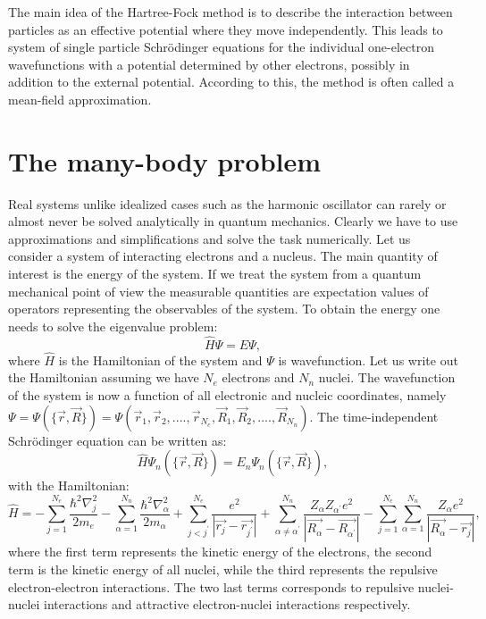 \documentclass[twoside,english]{uiofysmaster}
\begin{document}
The main idea of the Hartree-Fock method is to describe the
interaction between particles as an effective potential where they
move independently. This leads to system of single particle
Schr\"{o}dinger equations for the individual one-electron
wavefunctions with a potential determined by other electrons, possibly
in addition to the external potential. According to this, the  method is
often called a mean-field approximation.  \\




\section{The many-body problem}

Real systems unlike idealized cases such as the harmonic oscillator
can rarely or almost never be solved analytically in quantum mechanics.  Clearly we have
to use approximations and simplifications and solve the task
numerically.  Let us consider a system of interacting electrons and a
nucleus. The main quantity of interest is the energy of the system. If
we treat the system from a quantum mechanical point of view the
measurable quantities are expectation values of operators representing
the observables of the system.  To obtain the energy one needs to
solve the eigenvalue problem:
\[
\hat{H}\Psi = E\Psi,
\]
where $\hat{H}$ is the Hamiltonian of the system and $\Psi$ is
wavefunction.  Let us write out the Hamiltonian assuming we have $N_e$
electrons and $N_n$ nuclei. The wavefunction of the system is now a
function of all electronic and nucleic coordinates, namely
$\Psi=\Psi(\{\vec{r}, \vec{R}\}) = \Psi(\vec{r}_1, \vec{r}_2, ....,
\vec{r}_{N_e}, \vec{R}_1, \vec{R}_2, ...., \vec{R}_{N_n})$. The
time-independent Schr\"{o}dinger equation can be written as:
\begin{equation}\label{MBproblem}
\hat{H}\Psi_n(\{\vec{r}, \vec{R}\}) = E_n\Psi_n(\{\vec{r}, \vec{R}\}),
\end{equation}
with the Hamiltonian:
\[
\hat{H} = -\sum_{j=1}^{N_e} \frac{\hbar^2\nabla_j^2}{2m_e} -\sum_{\alpha=1}^{N_n} \frac{\hbar^2\nabla_{\alpha}^2}{2m_\alpha} +
\sum_{j<j^{\prime}}^{N_e} \frac{e^2}{|\vec{r_j} - \vec{r_{j^{\prime}}}|} + \sum_{\alpha\neq \alpha^{\prime}}^{N_n} \frac{Z_{\alpha}Z_{\alpha^{\prime}}e^2}{|\vec{R_{\alpha}} - \vec{R_{\alpha^{\prime}}}|} - \sum_{j=1}^{N_e} \sum_{\alpha=1}^{N_n} \frac{Z_{\alpha}e^2}{|\vec{R_{\alpha}} - \vec{r_j}|},
\]
where the first term represents the kinetic energy of the electrons,
the second term is the kinetic energy of all nuclei, while the third
represents the repulsive electron-electron interactions. The two last
terms corresponds to repulsive nuclei-nuclei interactions and
attractive electron-nuclei interactions respectively.
\end{document}
